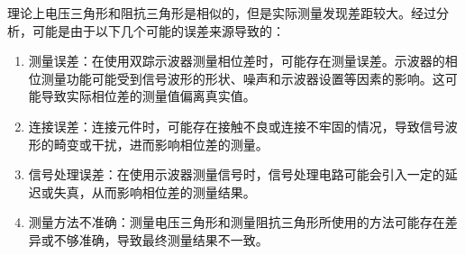 \documentclass[dvipsnames, svgnames,a4paper,11pt]{article}
\begin{document}
\begin{enumerate}
			理论上电压三角形和阻抗三角形是相似的，但是实际测量发现差距较大。经过分析，可能是由于以下几个可能的误差来源导致的：

			\begin{enumerate}
				\item 测量误差：在使用双踪示波器测量相位差时，可能存在测量误差。示波器的相位测量功能可能受到信号波形的形状、噪声和示波器设置等因素的影响。这可能导致实际相位差的测量值偏离真实值。
		
				\item 连接误差：连接元件时，可能存在接触不良或连接不牢固的情况，导致信号波形的畸变或干扰，进而影响相位差的测量。
			
				\item 信号处理误差：在使用示波器测量信号时，信号处理电路可能会引入一定的延迟或失真，从而影响相位差的测量结果。
			
				\item 测量方法不准确：测量电压三角形和测量阻抗三角形所使用的方法可能存在差异或不够准确，导致最终测量结果不一致。
			\end{enumerate}

		
		
			
			
	\end{enumerate}
	
\end{document}
